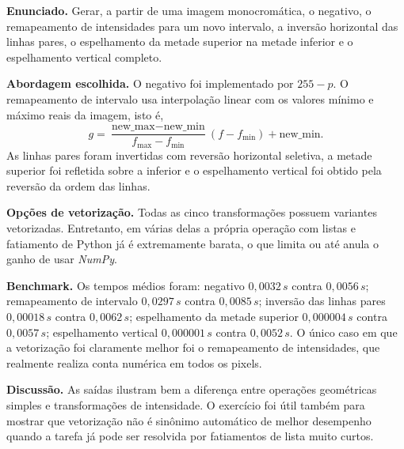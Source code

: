 \documentclass[12pt,a4paper]{article}
\newcommand{\campo}[2]{\textbf{#1.} #2\par}
\begin{document}
\campo{Enunciado}{Gerar, a partir de uma imagem monocromática, o negativo, o remapeamento de intensidades para um novo intervalo, a inversão horizontal das linhas pares, o espelhamento da metade superior na metade inferior e o espelhamento vertical completo.}
\campo{Abordagem escolhida}{O negativo foi implementado por $255-p$. O remapeamento de intervalo usa interpolação linear com os valores mínimo e máximo reais da imagem, isto é,
\[
g = \frac{\text{new\_max}-\text{new\_min}}{f_{\max}-f_{\min}}(f-f_{\min})+\text{new\_min}.
\]
As linhas pares foram invertidas com reversão horizontal seletiva, a metade superior foi refletida sobre a inferior e o espelhamento vertical foi obtido pela reversão da ordem das linhas.}
\campo{Opções de vetorização}{Todas as cinco transformações possuem variantes vetorizadas. Entretanto, em várias delas a própria operação com listas e fatiamento de Python já é extremamente barata, o que limita ou até anula o ganho de usar \textit{NumPy}.}
\campo{Benchmark}{Os tempos médios foram: negativo $0{,}0032\,s$ contra $0{,}0056\,s$; remapeamento de intervalo $0{,}0297\,s$ contra $0{,}0085\,s$; inversão das linhas pares $0{,}00018\,s$ contra $0{,}0062\,s$; espelhamento da metade superior $0{,}000004\,s$ contra $0{,}0057\,s$; espelhamento vertical $0{,}000001\,s$ contra $0{,}0052\,s$. O único caso em que a vetorização foi claramente melhor foi o remapeamento de intensidades, que realmente realiza conta numérica em todos os pixels.}
\campo{Discussão}{As saídas ilustram bem a diferença entre operações geométricas simples e transformações de intensidade. O exercício foi útil também para mostrar que vetorização não é sinônimo automático de melhor desempenho quando a tarefa já pode ser resolvida por fatiamentos de lista muito curtos.}
\end{document}
